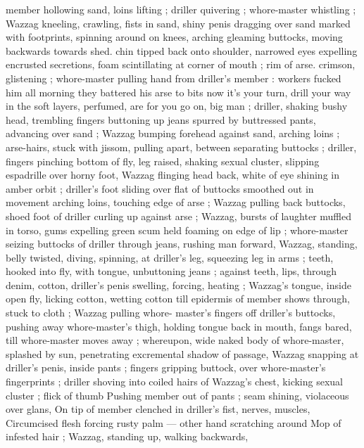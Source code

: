 member hollowing sand, loins lifting ; driller quivering ; whore-master 
whistling ; Wazzag kneeling, crawling, fists in sand, shiny penis 
dragging over sand marked with footprints, spinning around on 
knees, arching gleaming buttocks, moving backwards towards shed. 
chin tipped back onto shoulder, narrowed eyes expelling encrusted 
secretions, foam scintillating at corner of mouth ; rim of arse. 
crimson, glistening ; whore-master pulling hand from driller's 
member : {\td} {\gl} {\thd} workers fucked him all morning{\td} they battered his 
arse to bits{\thd} now it's your turn, drill your way in{\td} the soft layers, 
perfumed, are for you{\td} go on, big man {\gr} ; driller, shaking bushy head, 
trembling fingers buttoning up jeans spurred by buttressed pants, 
advancing over sand ; Wazzag bumping forehead against sand, 
arching loins ; arse-hairs, stuck with jissom, pulling apart, between 
separating buttocks ; driller, fingers pinching bottom of fly, leg 
raised, shaking sexual cluster, slipping espadrille over horny foot, 
Wazzag flinging head back, white of eye shining in amber orbit ; 
driller's foot sliding over flat of buttocks smoothed out in movement 
arching loins, touching edge of arse ; Wazzag pulling back buttocks, 
shoed foot of driller curling up against arse ; Wazzag, bursts of 
laughter muffled in torso, gums expelling green scum held foaming 
on edge of lip ; whore-master seizing buttocks of driller through 
jeans, rushing man forward, Wazzag, standing, belly twisted, diving, 
spinning, at driller's leg, squeezing leg in arms ; teeth, hooked into 
fly, with tongue, unbuttoning jeans ; against teeth, lips, through 
denim, cotton, driller's penis swelling, forcing, heating ; Wazzag's 
tongue, inside open fly, licking cotton, wetting cotton till epidermis 
of member shows through, stuck to cloth ; Wazzag pulling whore- 
master's fingers off driller's buttocks, pushing away whore-master's 
thigh, holding tongue back in mouth, fangs bared, till whore-master 
moves away ; whereupon, wide naked body of whore-master, 
splashed by sun, penetrating excremental shadow of passage, 
Wazzag snapping at driller's penis, inside pants ; fingers gripping 
buttock, over whore-master's fingerprints ; driller shoving into coiled 
hairs of Wazzag's chest, kicking sexual cluster ; flick of thumb 
Pushing member out of pants ; seam shining, violaceous over glans, 
On tip of member clenched in driller's fist, nerves, muscles, 
Circumcised flesh forcing rusty palm --- other hand scratching around 
Mop of infested hair ; Wazzag, standing up, walking backwards, 
